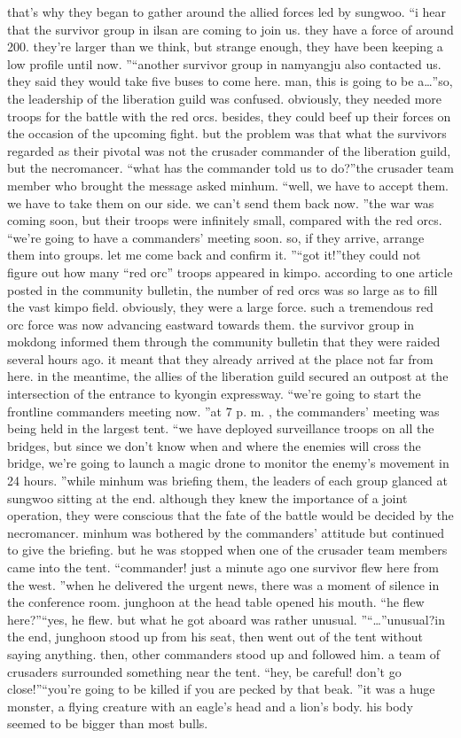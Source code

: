 that’s why they began to gather around the allied forces led by sungwoo.
“i hear that the survivor group in ilsan are coming to join us.
 they have a force of around 200.
 they’re larger than we think, but strange enough, they have been keeping a low profile until now.
”“another survivor group in namyangju also contacted us.
 they said they would take five buses to come here.
 man, this is going to be a…”so, the leadership of the liberation guild was confused.
 obviously, they needed more troops for the battle with the red orcs.
 besides, they could beef up their forces on the occasion of the upcoming fight.
but the problem was that what the survivors regarded as their pivotal was not the crusader commander of the liberation guild, but the necromancer.
“what has the commander told us to do?”the crusader team member who brought the message asked minhum.
“well, we have to accept them.
 we have to take them on our side.
 we can’t send them back now.
”the war was coming soon, but their troops were infinitely small, compared with the red orcs.
“we’re going to have a commanders’ meeting soon.
 so, if they arrive, arrange them into groups.
 let me come back and confirm it.
”“got it!”they could not figure out how many “red orc” troops appeared in kimpo.
according to one article posted in the community bulletin, the number of red orcs was so large as to fill the vast kimpo field.
 obviously, they were a large force.
such a tremendous red orc force was now advancing eastward towards them.
 the survivor group in mokdong informed them through the community bulletin that they were raided several hours ago.
 it meant that they already arrived at the place not far from here.
in the meantime, the allies of the liberation guild secured an outpost at the intersection of the entrance to kyongin expressway.
“we’re going to start the frontline commanders meeting now.
”at 7 p.
m.
, the commanders’ meeting was being held in the largest tent.
“we have deployed surveillance troops on all the bridges, but since we don’t know when and where the enemies will cross the bridge, we’re going to launch a magic drone to monitor the enemy’s movement in 24 hours.
”while minhum was briefing them, the leaders of each group glanced at sungwoo sitting at the end.
although they knew the importance of a joint operation, they were conscious that the fate of the battle would be decided by the necromancer.
minhum was bothered by the commanders’ attitude but continued to give the briefing.
 but he was stopped when one of the crusader team members came into the tent.
“commander! just a minute ago one survivor flew here from the west.
”when he delivered the urgent news, there was a moment of silence in the conference room.
junghoon at the head table opened his mouth.
“he flew here?”“yes, he flew.
 but what he got aboard was rather unusual.
”“…”unusual?in the end, junghoon stood up from his seat, then went out of the tent without saying anything.
 then, other commanders stood up and followed him.
a team of crusaders surrounded something near the tent.
“hey, be careful! don’t go close!”“you’re going to be killed if you are pecked by that beak.
”it was a huge monster, a flying creature with an eagle’s head and a lion’s body.
his body seemed to be bigger than most bulls.


